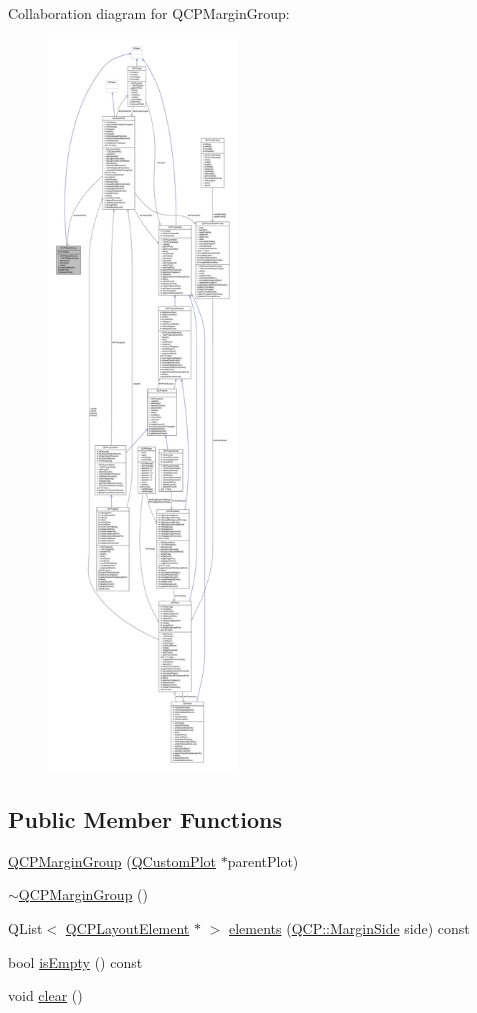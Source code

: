 Collaboration diagram for Q\+C\+P\+Margin\+Group\+:\nopagebreak
\begin{figure}[H]
\begin{center}
\leavevmode
\includegraphics[height=550pt]{class_q_c_p_margin_group__coll__graph}
\end{center}
\end{figure}
\subsection*{Public Member Functions}
\begin{DoxyCompactItemize}
\item 
\hyperlink{class_q_c_p_margin_group_ac481c20678ec5b305d6df330715f4b7b}{Q\+C\+P\+Margin\+Group} (\hyperlink{class_q_custom_plot}{Q\+Custom\+Plot} $\ast$parent\+Plot)
\item 
\hyperlink{class_q_c_p_margin_group_a42c62becdaac41406ca90f1c2a755e1c}{$\sim$\+Q\+C\+P\+Margin\+Group} ()
\item 
Q\+List$<$ \hyperlink{class_q_c_p_layout_element}{Q\+C\+P\+Layout\+Element} $\ast$ $>$ \hyperlink{class_q_c_p_margin_group_a2f39e319c9ece34e0392c2ca350f1069}{elements} (\hyperlink{namespace_q_c_p_a7e487e3e2ccb62ab7771065bab7cae54}{Q\+C\+P\+::\+Margin\+Side} side) const 
\item 
bool \hyperlink{class_q_c_p_margin_group_a28c8e87a0b87c01bd28c693faabddd7b}{is\+Empty} () const 
\item 
void \hyperlink{class_q_c_p_margin_group_a144b67f216e4e86c3a3a309e850285fe}{clear} ()
\end{DoxyCompactItemize}
